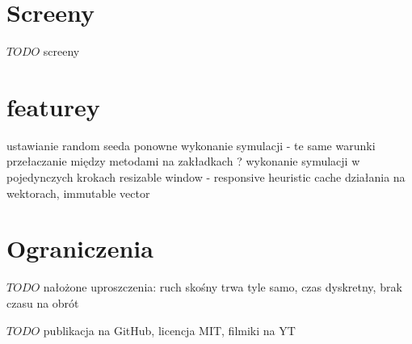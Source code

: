 \section{Screeny}
$TODO$ screeny

\section{featurey}
ustawianie random seeda
ponowne wykonanie symulacji - te same warunki
przełaczanie między metodami na zakładkach ?
wykonanie symulacji w pojedynczych krokach
resizable window - responsive
heuristic cache
działania na wektorach, immutable vector

\section{Ograniczenia}
$TODO$ nałożone uproszczenia: ruch skośny trwa tyle samo, czas dyskretny, brak czasu na obrót

$TODO$ publikacja na GitHub, licencja MIT, filmiki na YT